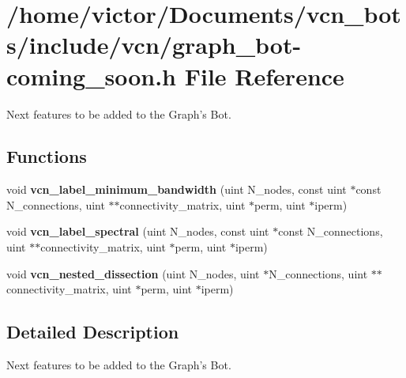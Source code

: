 \hypertarget{graph__bot-coming__soon_8h}{\section{/home/victor/\+Documents/vcn\+\_\+bots/include/vcn/graph\+\_\+bot-\/coming\+\_\+soon.h File Reference}
\label{graph__bot-coming__soon_8h}
}


Next features to be added to the Graph's Bot.  


\subsection*{Functions}
\begin{DoxyCompactItemize}
\item 
\hypertarget{graph__bot-coming__soon_8h_ab3967ef385306a83c1f3747f0101ac4f}{void {\bfseries vcn\+\_\+label\+\_\+minimum\+\_\+bandwidth} (uint N\+\_\+nodes, const uint $\ast$const N\+\_\+connections, uint $\ast$$\ast$connectivity\+\_\+matrix, uint $\ast$perm, uint $\ast$iperm)}\label{graph__bot-coming__soon_8h_ab3967ef385306a83c1f3747f0101ac4f}

\item 
\hypertarget{graph__bot-coming__soon_8h_aeb31fbc5d2d4bd578133e1188f3ff3c4}{void {\bfseries vcn\+\_\+label\+\_\+spectral} (uint N\+\_\+nodes, const uint $\ast$const N\+\_\+connections, uint $\ast$$\ast$connectivity\+\_\+matrix, uint $\ast$perm, uint $\ast$iperm)}\label{graph__bot-coming__soon_8h_aeb31fbc5d2d4bd578133e1188f3ff3c4}

\item 
\hypertarget{graph__bot-coming__soon_8h_a5adde6d64f7a1a44b0c1d97574afc4c8}{void {\bfseries vcn\+\_\+nested\+\_\+dissection} (uint N\+\_\+nodes, uint $\ast$N\+\_\+connections, uint $\ast$$\ast$connectivity\+\_\+matrix, uint $\ast$perm, uint $\ast$iperm)}\label{graph__bot-coming__soon_8h_a5adde6d64f7a1a44b0c1d97574afc4c8}

\end{DoxyCompactItemize}


\subsection{Detailed Description}
Next features to be added to the Graph's Bot. 

